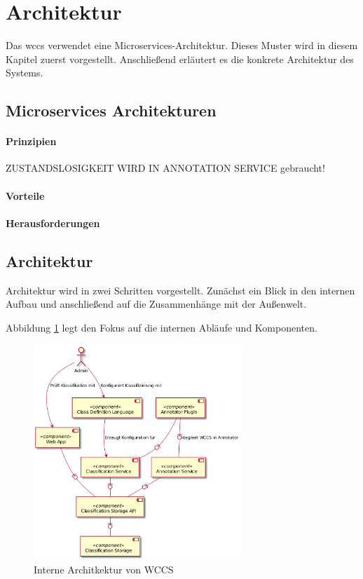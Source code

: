 \section{Architektur}
    \label{section:Architecture}
    Das \gls{wccs} verwendet eine Microservices-Architektur.
    Dieses Muster wird in diesem Kapitel zuerst vorgestellt.
    Anschließend erläutert es die konkrete Architektur des Systems.

    \subsection{Microservices Architekturen}
        \label{section:conceptMicroServices}
        \paragraph{Prinzipien}
            ZUSTANDSLOSIGKEIT WIRD IN ANNOTATION SERVICE gebraucht!
        \paragraph{Vorteile}
        \paragraph{Herausforderungen}

    \subsection{Architektur}
        Architektur wird in zwei Schritten vorgestellt.
        Zunächst ein Blick in den internen Aufbau und anschließend auf die Zusammenhänge mit der Außenwelt.
        
        Abbildung \ref{image:wccsInternalArchitecture} legt den Fokus auf die
        internen Abläufe und Komponenten.

        \begin{figure}
            \centering
            \includegraphics[width=0.7\textwidth]{../resources/architecture/wccs_internal_architecture.png}
            \caption{Interne Architkektur von WCCS}
            \label{image:wccsInternalArchitecture}
        \end{figure}

